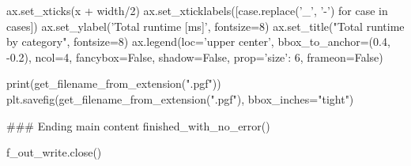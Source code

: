 ax.set_xticks(x + width/2)
ax.set_xticklabels([case.replace('_', '-') for case in cases])
ax.set_ylabel('Total runtime [ms]', fontsize=8)
ax.set_title("Total runtime by category", fontsize=8)
ax.legend(loc='upper center', bbox_to_anchor=(0.4, -0.2),
    ncol=4, fancybox=False, shadow=False, prop={'size': 6}, frameon=False)

print(get_filename_from_extension(".pgf"))
plt.savefig(get_filename_from_extension(".pgf"), bbox_inches="tight")




### Ending main content
finished_with_no_error()


f_out_write.close()





